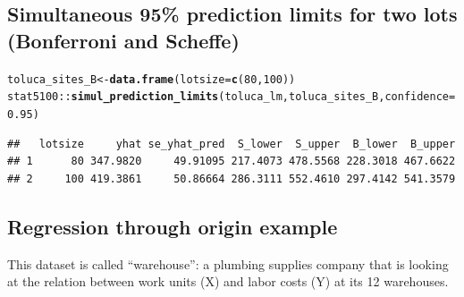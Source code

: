 \documentclass{article}\usepackage[]{graphicx}\usepackage[]{color}
\makeatletter
\newcommand{\hlnum}[1]{\textcolor[rgb]{0.686,0.059,0.569}{#1}}%
\newcommand{\hlopt}[1]{\textcolor[rgb]{0,0,0}{#1}}%
\newcommand{\hlstd}[1]{\textcolor[rgb]{0.345,0.345,0.345}{#1}}%
\newcommand{\hlkwb}[1]{\textcolor[rgb]{0.69,0.353,0.396}{#1}}%
\newcommand{\hlkwc}[1]{\textcolor[rgb]{0.333,0.667,0.333}{#1}}%
\newcommand{\hlkwd}[1]{\textcolor[rgb]{0.737,0.353,0.396}{\textbf{#1}}}%
\newenvironment{kframe}{%
 \def\at@end@of@kframe{}%
 \ifinner\ifhmode%
  \def\at@end@of@kframe{\end{minipage}}%
  \begin{minipage}{\columnwidth}%
 \fi\fi%
 \def\FrameCommand##1{\hskip\@totalleftmargin \hskip-\fboxsep
 \colorbox{shadecolor}{##1}\hskip-\fboxsep
     \hskip-\linewidth \hskip-\@totalleftmargin \hskip\columnwidth}%
 \MakeFramed {\advance\hsize-\width
   \@totalleftmargin\z@ \linewidth\hsize
   \@setminipage}}%
 {\par\unskip\endMakeFramed%
 \at@end@of@kframe}
\newenvironment{knitrout}{}{} %
\makeatother
\begin{document}
\subsection*{Simultaneous 95\% prediction limits for two lots (Bonferroni and Scheffe)}
\begin{knitrout}
\color{fgcolor}\begin{kframe}
\begin{alltt}
\hlstd{toluca_sites_B} \hlkwb{<-} \hlkwd{data.frame}\hlstd{(}\hlkwc{lotsize} \hlstd{=} \hlkwd{c}\hlstd{(}\hlnum{80}\hlstd{,} \hlnum{100}\hlstd{))}
\hlstd{stat5100}\hlopt{::}\hlkwd{simul_prediction_limits}\hlstd{(toluca_lm, toluca_sites_B,} \hlkwc{confidence} \hlstd{=} \hlnum{0.95}\hlstd{)}
\end{alltt}
\begin{verbatim}
##   lotsize     yhat se_yhat_pred  S_lower  S_upper  B_lower  B_upper
## 1      80 347.9820     49.91095 217.4073 478.5568 228.3018 467.6622
## 2     100 419.3861     50.86664 286.3111 552.4610 297.4142 541.3579
\end{verbatim}
\end{kframe}
\end{knitrout}

\subsection*{Regression through origin example}

This dataset is called ``warehouse'': a plumbing supplies company that is looking at the relation between work units (X) and labor costs (Y) at its 12 warehouses.
\end{document}
